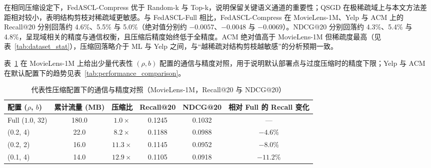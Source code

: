 \begin{table}[H]
    \centering
    \caption{不同压缩策略下的推荐性能对比（通信缩减 $\approx 8.2\times$，$\rho=0.2$，$b=4$）}
    \label{tab:performance_comparison}
\end{table}

在相同压缩设定下，FedASCL-Compress 优于 Random-k 与 Top-k，说明保留关键语义通道的重要性；QSGD 在极稀疏域上与本文方法差距相对较小，表明结构剪枝对稀疏域更敏感。与 FedASCL-Full 相比，FedASCL-Compress 在 MovieLens-1M、Yelp 与 ACM 上的 Recall@20 分别回落约 4.6\%、5.5\% 与 5.0\%（绝对值分别约 $-0.0057$、$-0.0048$ 与 $-0.0069$）。NDCG@20 分别回落约 4.3\%、5.4\% 与 4.8\%，呈现域相关的精度与通信权衡，且压缩后精度始终低于全精度。ACM 绝对值高于 MovieLens-1M 但稀疏度最高（见表~\ref{tab:dataset_stat}），压缩回落略介于 ML 与 Yelp 之间，与“越稀疏对结构剪枝越敏感”的分析预期一致。

表~\ref{tab:compression_tradeoff} 在 MovieLens-1M 上给出少量代表性 $(\rho,b)$ 配置的通信与精度对照，用于说明默认部署点与过度压缩时的精度下限；Yelp 与 ACM 在默认配置下的趋势见表~\ref{tab:performance_comparison}。

\begin{table}[H]
    \centering
    \caption{代表性压缩配置下的通信与精度对照（MovieLens-1M，Recall@20 与 NDCG@20）}
    \label{tab:compression_tradeoff}
    \footnotesize
    \begin{tabular}{lccccc}
        \toprule
        配置 ($\rho$, $b$) & 累计流量 (MB) & 压缩比 & Recall@20 & NDCG@20 & 相对 Full 的 Recall 变化 \\
        \midrule
        Full ($1.0$, 32) & 180.0 & $1.0\times$ & 0.1245 & 0.1032 & --- \\
        (0.2, 4) & 22.0 & $8.2\times$ & 0.1188 & 0.0988 & $-4.6\%$ \\
        (0.2, 2) & 16.0 & $11.3\times$ & 0.1145 & 0.0952 & $-8.0\%$ \\
        (0.1, 4) & 14.0 & $12.9\times$ & 0.1105 & 0.0918 & $-11.2\%$ \\
        \bottomrule
    \end{tabular}
\end{table}

